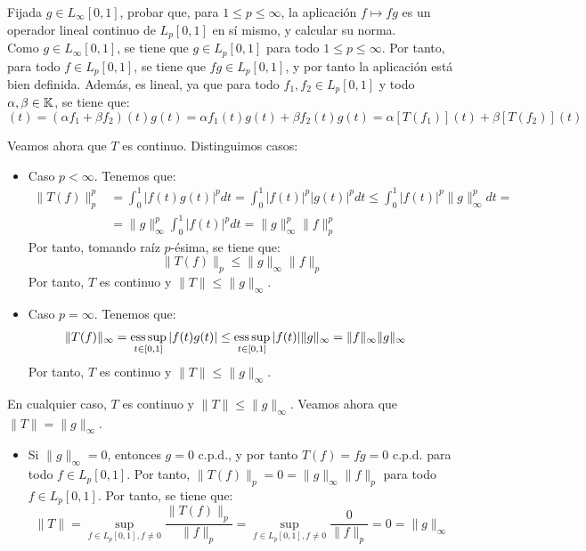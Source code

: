 \begin{ejercicio}
Fijada $g \in L_\infty\left[0, 1\right]$, probar que, para $1 \leq p \leq \infty$, la aplicación $f \mapsto fg$ es un operador lineal continuo de $L_p\left[0, 1\right]$ en sí mismo, y calcular su norma.\\

Como $g \in L_\infty\left[0, 1\right]$, se tiene que $g\in L_p\left[0, 1\right]$ para todo $1 \leq p \leq \infty$. Por tanto, para todo $f \in L_p\left[0, 1\right]$, se tiene que $fg \in L_p\left[0, 1\right]$, y por tanto la aplicación está bien definida. Además, es lineal, ya que para todo $f_1, f_2 \in L_p\left[0, 1\right]$ y todo $\alpha, \beta \in \mathbb{K}$, se tiene que:
\begin{equation*}
    [T(\alpha f_1 + \beta f_2)](t) = (\alpha f_1 + \beta f_2)(t) g(t) = \alpha f_1(t) g(t) + \beta f_2(t) g(t) = \alpha [T(f_1)](t) + \beta [T(f_2)](t)
\end{equation*}

Veamos ahora que $T$ es continuo. Distinguimos casos:
\begin{itemize}
    \item Caso $p < \infty$. Tenemos que:
    \begin{align*}
        \|T(f)\|_p^p &= \int_0^1 |f(t) g(t)|^p dt
        = \int_0^1 |f(t)|^p |g(t)|^p dt \leq \int_0^1 |f(t)|^p \|g\|_\infty^p dt =\\&= \|g\|_\infty^p \int_0^1 |f(t)|^p dt = \|g\|_\infty^p \|f\|_p^p
    \end{align*}
    Por tanto, tomando raíz $p$-ésima, se tiene que:
    \begin{equation*}
        \|T(f)\|_p \leq \|g\|_\infty \|f\|_p
    \end{equation*}
    Por tanto, $T$ es continuo y $\|T\| \leq \|g\|_\infty$.
    \item Caso $p = \infty$. Tenemos que:
    \begin{align*}
        \|T(f)\|_\infty &= \operatorname*{ess\,sup}_{t \in [0, 1]} |f(t) g(t)| \leq \operatorname*{ess\,sup}_{t \in [0, 1]} |f(t)|\|g\|_\infty = \|f\|_\infty \|g\|_\infty
    \end{align*}
    Por tanto, $T$ es continuo y $\|T\| \leq \|g\|_\infty$.
\end{itemize}

En cualquier caso, $T$ es continuo y $\|T\| \leq \|g\|_\infty$. Veamos ahora que $\|T\| = \|g\|_\infty$.
\begin{itemize}
    \item Si $\|g\|_\infty = 0$, entonces $g = 0$ c.p.d., y por tanto $T(f) = fg = 0$ c.p.d. para todo $f \in L_p\left[0, 1\right]$. Por tanto, $\|T(f)\|_p = 0 = \|g\|_\infty \|f\|_p$ para todo $f \in L_p\left[0, 1\right]$. Por tanto, se tiene que:
    \begin{equation*}
        \|T\| = \sup_{f \in L_p\left[0, 1\right], f \neq 0} \frac{\|T(f)\|_p}{\|f\|_p} = \sup_{f \in L_p\left[0, 1\right], f \neq 0} \frac{0}{\|f\|_p} = 0 = \|g\|_\infty
    \end{equation*}


\end{itemize}
\end{ejercicio}
